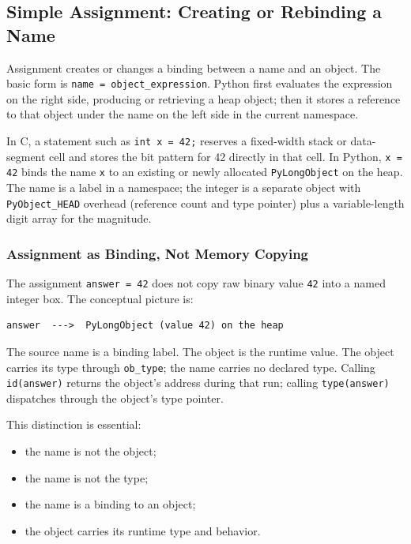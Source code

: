\subsection{Simple Assignment: Creating or Rebinding a Name}

Assignment creates or changes a binding between a name and an object. The basic form is \texttt{name = object\_expression}. Python first evaluates the expression on the right side, producing or retrieving a heap object; then it stores a reference to that object under the name on the left side in the current namespace.

In C, a statement such as \texttt{int x = 42;} reserves a fixed-width stack or data-segment cell and stores the bit pattern for 42 directly in that cell. In Python, \texttt{x = 42} binds the name \texttt{x} to an existing or newly allocated \texttt{PyLongObject} on the heap. The name is a label in a namespace; the integer is a separate object with \texttt{PyObject\_HEAD} overhead (reference count and type pointer) plus a variable-length digit array for the magnitude.

\subsubsection{Assignment as Binding, Not Memory Copying}

The assignment \texttt{answer = 42} does not copy raw binary value \texttt{42} into a named integer box. The conceptual picture is:

\begin{verbatim}
answer  --->  PyLongObject (value 42) on the heap
\end{verbatim}

The source name is a binding label. The object is the runtime value. The object carries its type through \texttt{ob\_type}; the name carries no declared type. Calling \texttt{id(answer)} returns the object's address during that run; calling \texttt{type(answer)} dispatches through the object's type pointer.

This distinction is essential:

\begin{itemize}
    \item the name is not the object;
    \item the name is not the type;
    \item the name is a binding to an object;
    \item the object carries its runtime type and behavior.
\end{itemize}

